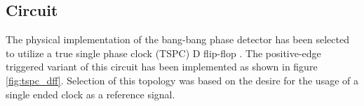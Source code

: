 




		\FloatBarrier






		\subsection{Circuit}
		The physical implementation of the bang-bang phase detector has been selected to utilize a true single phase clock (TSPC) D flip-flop \cite{Yuan1989}. The positive-edge triggered variant of this circuit has been implemented as shown in figure \ref{fig:tspc_dff}. Selection of this topology was based on the desire for the usage of a single ended clock as a reference signal.

